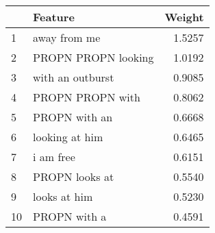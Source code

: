 \begin{tabular}{llr}
\toprule
{} &              Feature &  Weight \\
\midrule
1  &         away from me &  1.5257 \\
2  &  PROPN PROPN looking &  1.0192 \\
3  &     with an outburst &  0.9085 \\
4  &     PROPN PROPN with &  0.8062 \\
5  &        PROPN with an &  0.6668 \\
6  &       looking at him &  0.6465 \\
7  &            i am free &  0.6151 \\
8  &       PROPN looks at &  0.5540 \\
9  &         looks at him &  0.5230 \\
10 &         PROPN with a &  0.4591 \\
\bottomrule
\end{tabular}
